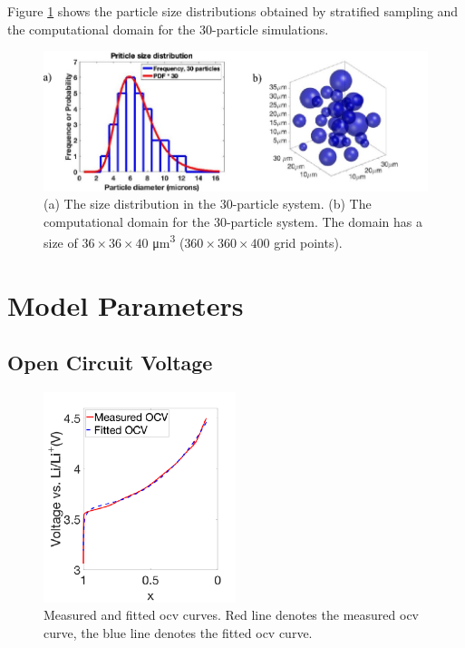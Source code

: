 \documentclass{article}
\begin{document}
Figure \ref{fig:30-particle-box} shows the particle size distributions
obtained by stratified sampling \cite{parsons2017} and the
computational domain for the 30-particle simulations.

\begin{figure}
  \includegraphics[width=\textwidth]{30-particle-simulation.pdf}
  \caption{(a) The size distribution in the 30-particle system. (b) The
    computational domain for the 30-particle system. The domain has a
    size of $36 \times 36 \times 40$ \si{\micro\meter\cubed} ($360
    \times 360 \times 400$ grid points).}
  \label{fig:30-particle-box}
\end{figure}

\section{Model Parameters}

\subsection{Open Circuit Voltage}

\begin{figure}
  \begin{center}
    \includegraphics[width=0.5\textwidth]{echem-fit.pdf}
  \end{center}
  \caption{Measured and fitted \gls{ocv} curves. Red line
    denotes the measured \gls{ocv} curve, the blue line denotes the
    fitted \gls{ocv} curve.}
  \label{fig:ocv-response}
\end{figure}
\end{document}
